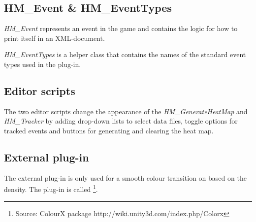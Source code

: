 \subsection{HM\_Event & HM\_EventTypes}
\label{CO_Event}
\textit{HM\_Event} represents an event in the game and contains the logic for how to print itself in an XML-document.

\textit{HM\_EventTypes} is a helper class that contains the names of the standard event types used in the plug-in.

\subsection{Editor scripts}
\label{CO_Editor}
The two editor scripts change the appearance of the \textit{HM\_GenerateHeatMap} and \textit{HM\_Tracker} by adding drop-down lists to select data files, toggle options for tracked events and buttons for generating and clearing the heat map.
\subsection{External plug-in}
\label{CO_PlugIn}
The external plug-in is only used for a smooth colour transition on based on the density. The plug-in is called \footnote{Source: ColourX package http://wiki.unity3d.com/index.php/Colorx}.
